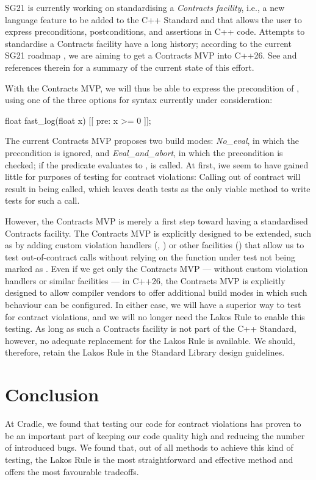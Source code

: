 SG21 is currently working on standardising a \emph{Contracts facility}, i.e., a new language feature to be added to the C++ Standard and that allows the user to express preconditions, postconditions, and assertions in C++ code. Attempts to standardise a Contracts facility have a long history; according to the current SG21 roadmap \cite{P2695R1}, we are aiming to get a Contracts MVP into C++26. See \cite{P2521R3} and references therein for a summary of the current state of this effort.

With the Contracts MVP, we will thus be able to express the precondition of , using one of the three options for syntax currently under consideration:
\begin{codeblock}
float fast_log(float x) [[ pre: x >= 0 ]];
\end{codeblock}

The current Contracts MVP proposes two build modes: \emph{No_eval}, in which the precondition is ignored, and \emph{Eval_and_abort}, in which the precondition is checked; if the predicate evaluates to ,  is called. At first, iwe seem to have gained little for purposes of testing for contract violations: Calling  out of contract will result in  being called, which leaves death tests as the only viable method to write tests for such a call.

However, the Contracts MVP is merely a first step toward having a standardised Contracts facility. The Contracts MVP is explicitly designed to be extended, such as by adding custom violation handlers (\cite{P2698R0}, \cite{P2811R0}) or other facilities (\cite{P2784R0}) that allow us to test out-of-contract calls without relying on the function under test not being marked as . Even if we get only the Contracts MVP --- without custom violation handlers or similar facilities --- in C++26, the Contracts MVP is explicitly designed to allow compiler vendors to offer additional build modes in which such behaviour can be configured. In either case, we will have a superior way to test for contract violations, and we will no longer need the Lakos Rule to enable this testing. As long as such a Contracts facility is not part of the C++ Standard, however, no adequate replacement for the Lakos Rule is available. We should, therefore, retain the Lakos Rule in the Standard Library design guidelines.

\section{Conclusion}
At Cradle, we found that testing our code for contract violations has proven to be an important part of keeping our code quality high and reducing the number of introduced bugs. We found that, out of all methods to achieve this kind of testing, the Lakos Rule is the most straightforward and effective method and offers the most favourable tradeoffs. 

